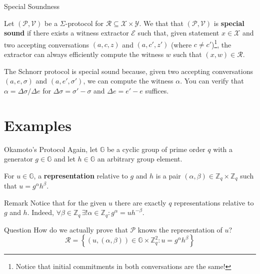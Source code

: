 \documentclass{zkdl-presentation-template}
\begin{document}
    \begin{frame}{Special Soundness}
        \begin{definition}
            Let $(\mathcal{P}, \mathcal{V})$ be a $\Sigma$-protocol for $\mathcal{R} \subseteq \mathcal{X} \times \mathcal{Y}$. We that that $(\mathcal{P},\mathcal{V})$ is \textbf{special sound} if there exists a witness extractor $\mathcal{E}$ such that, given statement $x \in \mathcal{X}$ and two accepting conversations $(a,c,z)$ and $(a,c',z')$ (where $c \neq c'$)\footnote{Notice that initial commitments in both conversations are the same!}, the extractor can always efficiently compute the witness $w$ such that $(x,w) \in \mathcal{R}$.
        \end{definition}

        \begin{example}
            The Schnorr protocol is special sound because, given two accepting conversations $(a,e,\sigma)$ and $(a,e',\sigma')$, we can compute the witness $\alpha$. You can verify that $\alpha = \Delta \sigma / \Delta e$ for $\Delta \sigma = \sigma' - \sigma$ and $\Delta e = e' - e$ suffices.
        \end{example}
    \end{frame}

    \section{Examples}

    \begin{frame}{Okamoto's Protocol}
        Again, let $\mathbb{G}$ be a cyclic group of prime order $q$ with a generator $g \in \mathbb{G}$ and let $h \in \mathbb{G}$ an arbitrary group element.

        \begin{definition}
            For $u \in \mathbb{G}$, a \textbf{representation} relative to $g$ and $h$ is a pair $(\alpha,\beta) \in \mathbb{Z}_q \times \mathbb{Z}_q$ such that $u=g^{\alpha}h^{\beta}$.
        \end{definition}

        \begin{block}{Remark}
            Notice that for the given $u$ there are exactly $q$ representations relative to $g$ and $h$. Indeed, $\forall \beta \in \mathbb{Z}_q \, \exists! \alpha \in \mathbb{Z}_q: g^{\alpha} = uh^{-\beta}$. 
        \end{block}

        \begin{alertblock}{Question}
            How do we actually prove that $\mathcal{P}$ knows the representation of $u$?
            \begin{equation*}
                \mathcal{R} = \left\{ (u,(\alpha,\beta)) \in \mathbb{G} \times \mathbb{Z}_q^2: u = g^{\alpha}h^{\beta} \right\}
            \end{equation*}
        \end{alertblock}
    \end{frame}
\end{document}
